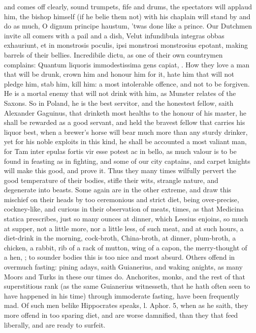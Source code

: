 {{and comes off clearly, sound trumpets, fife and drums, the spectators
will applaud him, the bishop himself (if he belie them not) with
his chaplain will stand by and do as much, O dignum principe haustum,
'twas done like a prince. Our Dutchmen invite all comers with a pail
and a dish, Velut infundibula integras obbas exhauriunt, et in
monstrosis poculis, ipsi monstrosi monstrosius epotant, making barrels
of their bellies. Incredibile dictu, as one of their own
countrymen complains: Quantum liquoris immodestissima gens
capiat, \etc{}. How they love a man that will be drunk, crown him and
honour him for it, hate him that will not pledge him, stab him, kill
him: a most intolerable offence, and not to be forgiven. He is a
mortal enemy that will not drink with him, as Munster relates of the
Saxons. So in Poland, he is the best servitor, and the honestest
fellow, saith Alexander Gaguinus,  that drinketh most healths to
the honour of his master, he shall be rewarded as a good servant, and
held the bravest fellow that carries his liquor best, when a brewer's
horse will bear much more than any sturdy drinker, yet for his noble
exploits in this kind, he shall be accounted a most valiant man, for
Tam inter epulas fortis vir esse potest ac in bello, as much
valour is to be found in feasting as in fighting, and some of our city
captains, and carpet knights will make this good, and prove it. Thus
they many times wilfully pervert the good temperature of their bodies,
stifle their wits, strangle nature, and degenerate into beasts.
Some again are in the other extreme, and draw this mischief on their
heads by too ceremonious and strict diet, being over-precise,
cockney-like, and curious in their observation of meats, times, as that
Medicina statica prescribes, just so many ounces at dinner, which
Lessius enjoins, so much at supper, not a little more, nor a little
less, of such meat, and at such hours, a diet-drink in the morning,
cock-broth, China-broth, at dinner, plum-broth, a chicken, a rabbit,
rib of a rack of mutton, wing of a capon, the merry-thought of a hen,
\etc{}; to sounder bodies this is too nice and most absurd. Others offend
in overmuch fasting: pining adays, saith  Guianerius, and waking
anights, as many Moors and Turks in these our times do. Anchorites,
monks, and the rest of that superstitious rank (as the same Guianerius
witnesseth, that he hath often seen to have happened in his time)
through immoderate fasting, have been frequently mad. Of such men
belike Hippocrates speaks, l. Aphor. 5, when as he saith, they
more offend in too sparing diet, and are worse damnified, than they
that feed liberally, and are ready to surfeit.

}}
